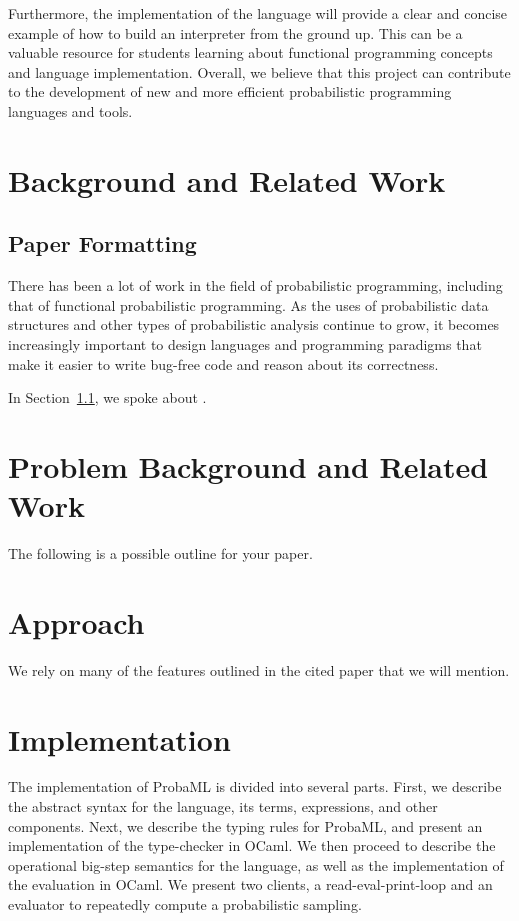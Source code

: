 \documentclass[pageno]{jpaper}
\begin{document}
Furthermore, the implementation of the language will provide a clear and concise example of how to build an interpreter from the ground up. This can be a valuable resource for students learning about functional programming concepts and language implementation. Overall, we believe that this project can contribute to the development of new and more efficient probabilistic programming languages and tools.

\section{Background and Related Work}

\subsection{Paper Formatting}
\label{section:formatting}

There has been a lot of work in the field of probabilistic programming, including that of functional probabilistic programming. As the uses of probabilistic data structures and other types of probabilistic analysis continue to grow, it becomes increasingly important to design languages and programming paradigms that make it easier to write bug-free code and reason about its correctness.

In Section~\ref{section:formatting}, we spoke about \cite{nicepaper,nicepaper2}.

\section{Problem Background and Related Work}
The following is a possible outline for your paper.

\section{Approach}
We rely on many of the features outlined in the cited paper that we will mention.

\section{Implementation}
The implementation of ProbaML is divided into several parts. First, we describe the abstract syntax for the language, its terms, expressions, and other components. Next, we describe the typing rules for ProbaML, and present an implementation of the type-checker in OCaml. We then proceed to describe the operational big-step semantics for the language, as well as the implementation of the evaluation in OCaml. We present two clients, a read-eval-print-loop and an evaluator to repeatedly compute a probabilistic sampling.
\end{document}
